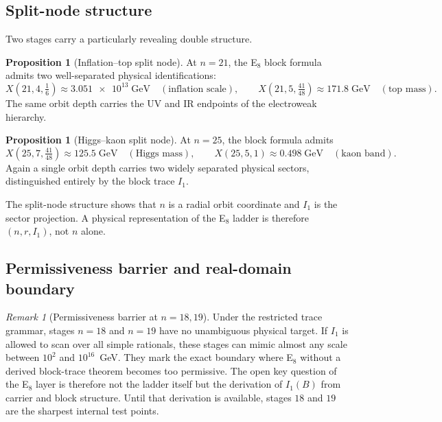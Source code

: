 \documentclass[11pt,a4paper]{article}
\theoremstyle{definition}
\newtheorem{proposition}[theorem]{Proposition}
\theoremstyle{remark}
\newtheorem*{remark}{Remark}
\begin{document}
\subsection{Split-node structure}

Two stages carry a particularly revealing double structure.

\begin{proposition}[Inflation--top split node]
At $n=21$, the E$_8$ block formula admits two well-separated physical identifications:
\[
X(21,4,\tfrac16)\approx\num{3.051e13}\;\mathrm{GeV}\quad(\text{inflation scale}),
\qquad
X(21,5,\tfrac{41}{48})\approx\num{171.8}\;\mathrm{GeV}\quad(\text{top mass}).
\]
The same orbit depth carries the UV and IR endpoints of the electroweak hierarchy.
\end{proposition}

\begin{proposition}[Higgs--kaon split node]
At $n=25$, the block formula admits
\[
X(25,7,\tfrac{41}{48})\approx\num{125.5}\;\mathrm{GeV}\quad(\text{Higgs mass}),
\qquad
X(25,5,1)\approx\num{0.498}\;\mathrm{GeV}\quad(\text{kaon band}).
\]
Again a single orbit depth carries two widely separated physical sectors, distinguished entirely by the block trace $I_1$.
\end{proposition}

The split-node structure shows that $n$ is a radial orbit coordinate and $I_1$ is the sector projection. A physical representation of the E$_8$ ladder is therefore $(n,r,I_1)$, not $n$ alone.

\subsection{Permissiveness barrier and real-domain boundary}

\begin{remark}[Permissiveness barrier at $n=18{,}19$]
Under the restricted trace grammar, stages $n=18$ and $n=19$ have no unambiguous physical target. If $I_1$ is allowed to scan over all simple rationals, these stages can mimic almost any scale between $10^2$ and $10^{16}$~GeV. They mark the exact boundary where E$_8$ without a derived block-trace theorem becomes too permissive. The open key question of the E$_8$ layer is therefore not the ladder itself but the derivation of $I_1(B)$ from carrier and block structure. Until that derivation is available, stages $18$ and $19$ are the sharpest internal test points.
\end{remark}
\end{document}
